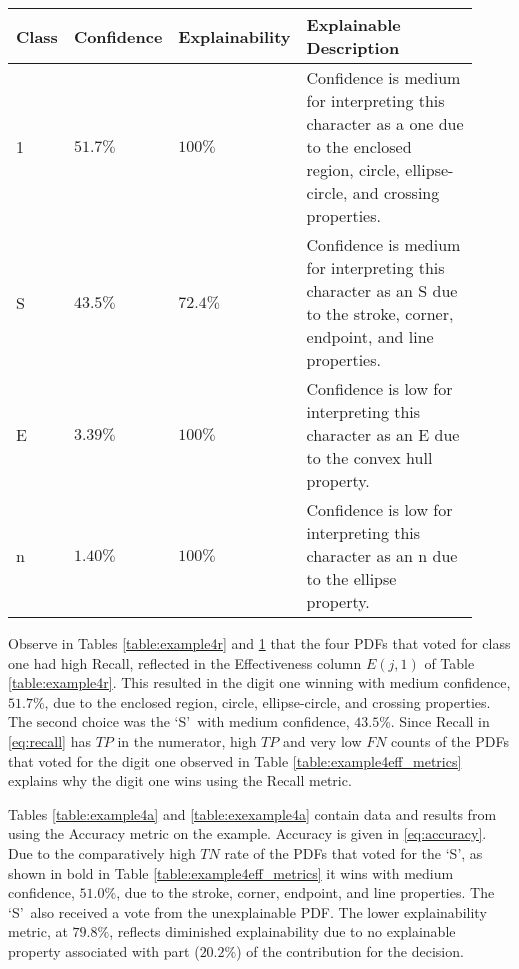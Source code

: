 \begin{table}[H]
    \renewcommand{\arraystretch}{1.3}
     \label{table:exexample4r}
    \begin{tabular}{| m{0.06\linewidth} | m{0.14\linewidth} | m{0.17\linewidth} | m{0.55\linewidth} |}
        \hline
         Class & Confidence & Explainability & Explainable Description \\
        \hline \hline
        1 & $51.7\%$ & $100\%$ & Confidence is medium for interpreting this character as a one due to the enclosed region, circle, ellipse-circle, and crossing properties. \\ 
        \hline
        S & $43.5\%$ & $72.4\%$ & Confidence is medium for interpreting this character as an S due to the stroke, corner, endpoint, and line properties. \\
        \hline
        E & $3.39\%$ & $100\%$ & Confidence is low for interpreting this character as an E due to the convex hull property. \\
        \hline
        n & $1.40\%$ & $100\%$ & Confidence is low for interpreting this character as an n due to the ellipse property. \\
        \hline
    \end{tabular}
\end{table}

Observe in Tables \ref{table:example4r} and \ref{table:exexample4r} that the
four PDFs that voted for class one had high Recall, reflected in the
Effectiveness column $E(j,1)$ of Table \ref{table:example4r}.  This resulted in
the digit one winning with medium confidence, $51.7\%$, due to the enclosed
region, circle, ellipse-circle, and crossing properties.  The second choice was
the \lq{S}\rq~with medium confidence, $43.5\%$. Since Recall in
\eqref{eq:recall} has $TP$ in the numerator, high $TP$ and very low $FN$ counts
of the PDFs that voted for the digit one observed in Table
\ref{table:example4eff_metrics} explains why the digit one wins using the Recall
metric.

Tables \ref{table:example4a} and \ref{table:exexample4a} contain data and
results from using the Accuracy metric on the example.  Accuracy is given in
\eqref{eq:accuracy}.  Due to the comparatively high $TN$ rate of the PDFs that
voted for the \lq{S}\rq, as shown in bold in Table
\ref{table:example4eff_metrics} it wins with medium confidence, $51.0\%$, due to
the stroke, corner, endpoint, and line properties. The \lq{S}\rq~also received a
vote from the unexplainable PDF.  The lower explainability metric, at $79.8\%$,
reflects diminished explainability due to no explainable property associated
with part ($20.2\%$) of the contribution for the decision.

